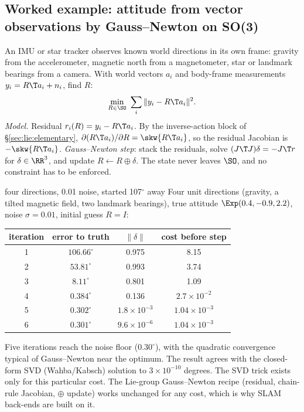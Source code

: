 \subsection{Worked example: attitude from vector observations by Gauss--Newton on SO(3)}\label{sec:lie:wahba}

An IMU or star tracker observes known world directions in its own frame: gravity from the accelerometer, magnetic north from a magnetometer, star or landmark bearings from a camera. With world vectors $a_i$ and body-frame measurements $y_i=R\T a_i+n_i$, find $R$:
\[
\min_{R\in\SO}\ \sum_i\|y_i-R\T a_i\|^2 .
\]
\emph{Model.} Residual $r_i(R)=y_i-R\T a_i$. By the inverse-action block of \S\ref{sec:lie:elementary}, $\partial(R\T a_i)/\partial R=\skw{R\T a_i}$, so the residual Jacobian is $-\skw{R\T a_i}$. \emph{Gauss--Newton step}: stack the residuals, solve $(J\T J)\delta=-J\T r$ for $\delta\in\RR^3$, and update $R\leftarrow R\oplus\delta$. The state never leaves $\SO$, and no constraint has to be enforced.

\begin{example}{four directions, 0.01 noise, started 107$^\circ$ away}
Four unit directions (gravity, a tilted magnetic field, two landmark bearings), true attitude $\Exp(0.4,-0.9,2.2)$, noise $\sigma=0.01$, initial guess $R=I$:
\begin{center}\small
\begin{tabular}{@{}cccc@{}}\toprule
iteration & error to truth & $\|\delta\|$ & cost before step\\\midrule
1 & $106.66^\circ$ & 0.975 & 8.15\\
2 & $53.81^\circ$ & 0.993 & 3.74\\
3 & $8.11^\circ$ & 0.801 & 1.09\\
4 & $0.384^\circ$ & 0.136 & $2.7\times10^{-2}$\\
5 & $0.302^\circ$ & $1.8\times10^{-3}$ & $1.04\times10^{-3}$\\
6 & $0.301^\circ$ & $9.6\times10^{-6}$ & $1.04\times10^{-3}$\\\bottomrule
\end{tabular}
\end{center}
Five iterations reach the noise floor ($0.30^\circ$), with the quadratic convergence typical of Gauss--Newton near the optimum. The result agrees with the closed-form SVD (Wahba/Kabsch) solution to $3\times10^{-10}$ degrees. The SVD trick exists only for this particular cost. The Lie-group Gauss--Newton recipe (residual, chain-rule Jacobian, $\oplus$ update) works unchanged for any cost, which is why SLAM back-ends are built on it.
\end{example}
